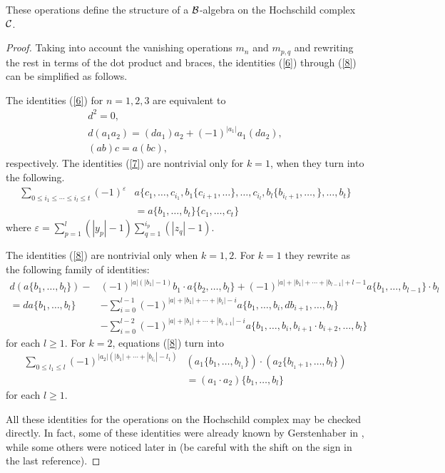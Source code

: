 \documentclass[TFM.tex]{subfiles}
\begin{document}
\begin{thm}
These operations define the structure of a $\mathcal{B}$-algebra on the Hochschild complex $\mathcal{C}$.
\end{thm}
\begin{proof}
Taking into account the vanishing operations $m_n$ and $m_{p,q}$ and rewriting
the rest in terms of the dot product and braces, the identities (\ref{6}) through (\ref{8}) can
be simplified as follows.

The identities (\ref{6}) for $n=1,2,3$ are equivalent to
\begin{gather*}
d^2=0,\\
d(a_1a_2)=(da_1)a_2+(-1)^{|a_1|}a_1(da_2),\\
(ab)c=a(bc),
\end{gather*}
respectively. The identities (\ref{7}) are nontrivial only for $k = 1$, when they turn into the following.
\begin{align*}
\sum_{0\leq i_1\leq\cdots\leq i_l\leq t}(-1)^{\varepsilon}&a\{c_1,\dots, c_{i_1},b_1\{c_{i+1},\dots\},\dots,c_{i_l},b_l\{b_{i_l+1},\dots,\},\dots,b_t\}\\
&=a\{b_1,\dots, b_t\}\{c_1,\dots, c_t\}
\end{align*}
where $\varepsilon=\sum_{p=1}^l(|y_p|-1)\sum_{q=1}^{i_p}(|z_q|-1)$.

The identities (\ref{8}) are nontrivial only when $k = 1,2$. For $k = 1$ they rewrite
as the following family of identities:
\begin{equation}\label{9}
\begin{aligned}
d(a\{b_1,\dots, b_l\})-&(-1)^{|a|(|b_1|-1)}b_1\cdot a\{b_2,\dots,b_l\}+(-1)^{|a|+|b_1|+\cdots+|b_{l-1}|+l-1}a\{b_1,\dots, b_{l-1}\}\cdot b_l\\
=da\{b_1,\dots, b_l\}&-\sum_{i=0}^{l-1}(-1)^{|a|+|b_1|+\cdots+|b_i|-i}a\{b_1,\dots, b_i,db_{i+1},\dots,b_l\}\\
&-\sum_{i=0}^{l-2}(-1)^{|a|+|b_1|+\cdots+|b_{i+1}|-i}a\{b_1,\dots, b_i,b_{i+1}\cdot b_{i+2},\dots,b_l\}
\end{aligned}
\end{equation}
for each $l ≥ 1$. For $k = 2$, equations (\ref{8}) turn into
\begin{equation}
\begin{aligned}
\sum_{0\leq l_1\leq l}(-1)^{|a_2|(|b_1|+\cdots+|b_{l_1}|-l_1)}&(a_1\{b_1,\dots, b_{l_1}\})\cdot(a_2\{b_{l_1+1},\dots, b_l\})\\
&=(a_1\cdot a_2)\{b_1,\dots, b_l\}
\end{aligned}
\end{equation}
for each $l ≥ 1$.

All these identities for the operations on the Hochschild complex may be checked
directly. In fact, some of these identities were already known by Gerstenhaber in \cite{Gerstenhaber}, while some others were noticed later in \cite{GH} (be careful with the shift on the sign in the last reference).
\end{proof}
\end{document}
